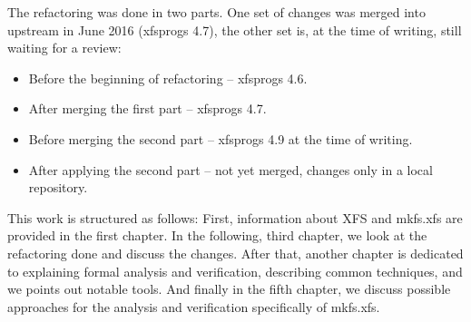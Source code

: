 The refactoring was done in two parts. One set of changes was merged into upstream in June 2016 (xfsprogs 4.7), the other set is, at the time of writing, still waiting for a review:
\begin{itemize}
\item Before the beginning of refactoring -- xfsprogs 4.6.
\item After merging the first part -- xfsprogs 4.7.
\item Before merging the second part -- xfsprogs 4.9 at the time of writing.
\item After applying the second part -- not yet merged, changes only in a local repository.
\end{itemize}

This work is structured as follows: First, information about XFS and
mkfs.xfs are provided in the first chapter. In the following, third chapter, we look
at the refactoring done and discuss the changes. After that, another
chapter is dedicated to explaining formal analysis and verification,
describing common techniques, and we points out notable tools. And finally
in the fifth chapter, we discuss possible approaches for the analysis and
verification specifically of mkfs.xfs.

